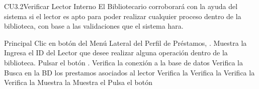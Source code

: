 
	\begin{UseCase}{CU3.2}{Verificar Lector Interno}{
		El Bibliotecario corroborará con la ayuda del sistema si el lector es apto para poder realizar cualquier proceso dentro de la biblioteca, con base a las validaciones que el sistema hara.
	}
	\end{UseCase}
	\begin{UCtrayectoria}{Principal}
		\UCpaso[\UCactor] Clic en botón  del Menú Lateral del Perfil de Préstamos, .
		\UCpaso[\UCsist] Muestra la   
		\UCpaso[\UCactor] Ingresa el ID del Lector que desee realizar alguna operación dentro de la biblioteca.
		\UCpaso[\UCactor] Pulsar el botón . 
		\UCpaso[\UCsist] Verifica la conexión a la base de datos  
		\UCpaso[\UCsist] Verifica la   
		\UCpaso[\UCsist] Busca en la BD los prestamos asociados al lector
		\UCpaso[\UCsist] Verifica la  
		\UCpaso[\UCsist] Verifica la  
		\UCpaso[\UCsist] Verifica la  
		\UCpaso[\UCsist] Verifica la  
		\UCpaso[\UCsist] Muestra la 
		\UCpaso[\UCsist] Muestra el 
		\UCpaso[\UCactor] Pulsa el botón  
	\end{UCtrayectoria}


